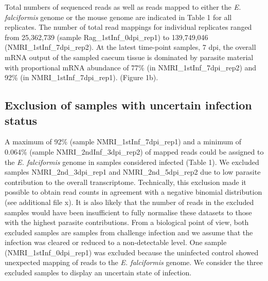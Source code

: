 \documentclass{bmcart}
\begin{document}
Total numbers of sequenced reads as well as reads mapped to either the \textit{E. falciformis} genome or the mouse genome are indicated in Table 1 for all replicates. The number of total read mappings for individual replicates ranged from 25,362,739 (sample Rag\_1stInf\_0dpi\_rep1) to 139,749,046 (NMRI\_1stInf\_7dpi\_rep2). At the latest time-point samples, 7 dpi, the overall mRNA output of the sampled caecum tissue is dominated by parasite material with proportional mRNA abundance of 77\% (in NMRI\_1stInf\_7dpi\_rep2) and 92\% (in NMRI\_1stInf\_7dpi\_rep1). (Figure 1b). 

\subsection*{Exclusion of samples with uncertain infection status}
A maximum of 92\% (sample NMRI\_1stInf\_7dpi\_rep1) and a minimum of 0.064\% (sample NMRI\_2ndInf\_3dpi\_rep2) of mapped reads could be assigned to the \textit{E. falciformis} genome in samples considered infected (Table 1). We excluded samples NMRI\_2nd\_3dpi\_rep1 and NMRI\_2nd\_5dpi\_rep2 due to low parasite contribution to the overall transcriptome. Technically, this exclusion made it possible to obtain read counts in agreement with a negative binomial distribution (see additional file x). It is also likely that the number of reads in the excluded samples would have been insufficient to fully normalise these datasets to those with the highest parasite contributions. From a biological point of view, both excluded samples are samples from challenge infection and we assume that the infection was cleared or reduced to a non-detectable level. One sample (NMRI\_1stInf\_0dpi\_rep1) was excluded because the uninfected control showed unexpected mapping of reads to the \textit{E. falciformis} genome. We consider the three excluded samples to display an uncertain state of infection.
\end{document}
